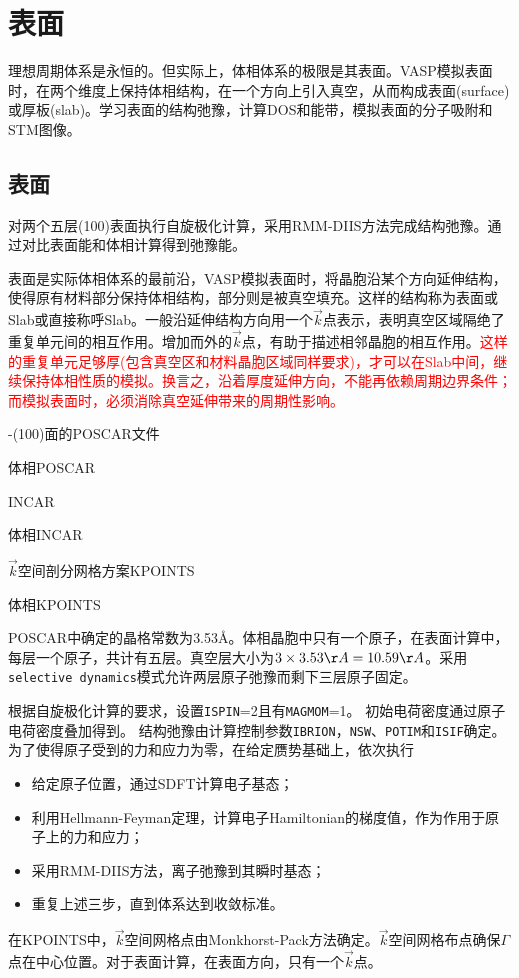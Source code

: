 \section{表面}
理想周期体系是永恒的。但实际上，体相体系的极限是其表面。\textrm{VASP}模拟表面时，在两个维度上保持体相结构，在一个方向上引入真空，从而构成表面\textrm{(surface)}或厚板\textrm{(slab)}。学习表面的结构弛豫，计算\textrm{DOS}和能带，模拟表面的分子吸附和\textrm{STM}图像。

\subsection{表面}
对两个五层\textrm{(100)}表面执行自旋极化计算，采用\textrm{RMM-DIIS}方法完成结构弛豫。通过对比表面能和体相计算得到弛豫能。

表面是实际体相体系的最前沿，\textrm{VASP}模拟表面时，将晶胞沿某个方向延伸结构，使得原有材料部分保持体相结构，部分则是被真空填充。这样的结构称为表面或\textrm{Slab}或直接称呼\textrm{Slab}。一般沿延伸结构方向用一个$\vec k$点表示，表明真空区域隔绝了重复单元间的相互作用。增加而外的$\vec k$点，有助于描述相邻晶胞的相互作用。\textcolor{red}{这样的重复单元足够厚(包含真空区和材料晶胞区域同样要求)，才可以在\textrm{Slab}中间，继续保持体相性质的模拟。换言之，沿着厚度延伸方向，不能再依赖周期边界条件；而模拟表面时，必须消除真空延伸带来的周期性影响。}

-\textrm{(100)}面的\textrm{POSCAR}文件

体相\textrm{POSCAR}

\textrm{INCAR}

体相\textrm{INCAR}

$\vec k$空间剖分网格方案\textrm{KPOINTS}

体相\textrm{KPOINTS}

\textrm{POSCAR}中确定的晶格常数为\textrm{3.53\AA}。体相晶胞中只有一个原子，在表面计算中，每层一个原子，共计有五层。真空层大小为$3\times3.53\AA=10.59\AA$。采用\texttt{selective dynamics}模式允许两层原子弛豫而剩下三层原子固定。

根据自旋极化计算的要求，设置\texttt{ISPIN}=2且有\texttt{MAGMOM}=1。%
初始电荷密度通过原子电荷密度叠加得到。%
结构弛豫由计算控制参数\texttt{IBRION}，\texttt{NSW}、\texttt{POTIM}和\texttt{ISIF}确定。为了使得原子受到的力和应力为零，在给定赝势基础上，依次执行
\begin{itemize}
	\item 给定原子位置，通过\textrm{SDFT}计算电子基态；
	\item 利用\textrm{Hellmann-Feyman}定理，计算电子\textrm{Hamiltonian}的梯度值，作为作用于原子上的力和应力；
	\item 采用\textrm{RMM-DIIS}方法，离子弛豫到其瞬时基态；
	\item 重复上述三步，直到体系达到收敛标准。
\end{itemize}
在\textrm{KPOINTS}中，$\vec k$空间网格点由\textrm{Monkhorst-Pack}方法确定。$\vec k$空间网格布点确保$\Gamma$点在中心位置。对于表面计算，在表面方向，只有一个$\vec k$点。


